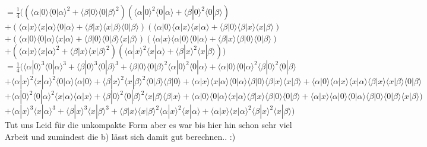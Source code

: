 \documentclass[a4paper]{scrartcl}
\begin{document}
\begin{enumerate}[a)]
$=\frac{1}{4} ((\langle \alpha|0\rangle \langle 0|\alpha\rangle^2 + \langle \beta|0\rangle \langle 0|\beta\rangle^2) (\langle \alpha|0\rangle^2 \langle 0|\alpha\rangle + \langle \beta|0\rangle^2 \langle 0|\beta\rangle)$\\
$+(\langle \alpha|x\rangle \langle x|\alpha\rangle\langle 0|\alpha\rangle + \langle \beta|x\rangle \langle x|\beta\rangle\langle 0|\beta\rangle) (\langle \alpha|0\rangle\langle \alpha|x\rangle \langle x|\alpha\rangle + \langle \beta|0\rangle\langle \beta|x\rangle \langle x|\beta\rangle) $\\
$+(\langle \alpha|0\rangle \langle 0|\alpha\rangle\langle x|\alpha\rangle + \langle \beta|0\rangle \langle 0|\beta\rangle\langle x|\beta\rangle) (\langle \alpha|x\rangle\langle \alpha|0\rangle \langle 0|\alpha\rangle + \langle \beta|x\rangle\langle \beta|0\rangle \langle 0|\beta\rangle) $\\
$+(\langle \alpha|x\rangle \langle x|\alpha\rangle^2 + \langle \beta|x\rangle \langle x|\beta\rangle^2) ( \langle\alpha|x\rangle^2 \langle x|\alpha\rangle + \langle \beta|x\rangle^2 \langle x|\beta\rangle))$\\

$=\frac{1}{4} (\langle \alpha|0\rangle^3 \langle 0|\alpha\rangle^3 + \langle \beta|0\rangle^3 \langle 0|\beta\rangle^3 + \langle \beta|0\rangle \langle 0|\beta\rangle^2 \langle \alpha|0\rangle^2 \langle 0|\alpha\rangle + \langle \alpha|0\rangle \langle 0|\alpha\rangle^2 \langle \beta|0\rangle^2 \langle 0|\beta\rangle$\\
$+\langle \alpha|x\rangle^2 \langle x|\alpha\rangle^2\langle 0|\alpha\rangle\langle \alpha|0\rangle + \langle \beta|x\rangle^2 \langle x|\beta\rangle^2\langle 0|\beta\rangle\langle \beta|0\rangle + \langle \alpha|x\rangle \langle x|\alpha\rangle\langle 0|\alpha\rangle  \langle \beta|0\rangle\langle \beta|x\rangle \langle x|\beta\rangle + \langle \alpha|0\rangle\langle \alpha|x\rangle \langle x|\alpha\rangle \langle \beta|x\rangle \langle x|\beta\rangle\langle 0|\beta\rangle$\\
$+\langle \alpha|0\rangle^2 \langle 0|\alpha\rangle^2\langle x|\alpha\rangle\langle \alpha|x\rangle + \langle \beta|0\rangle^2 \langle 0|\beta\rangle^2\langle x|\beta\rangle\langle \beta|x\rangle + \langle \alpha|0\rangle \langle 0|\alpha\rangle\langle x|\alpha\rangle \langle \beta|x\rangle\langle \beta|0\rangle \langle 0|\beta\rangle + \langle \alpha|x\rangle\langle \alpha|0\rangle \langle 0|\alpha\rangle \langle \beta|0\rangle \langle 0|\beta\rangle\langle x|\beta\rangle)$\\
$+\langle \alpha|x\rangle^3 \langle x|\alpha\rangle^3 + \langle \beta|x\rangle^3 \langle x|\beta\rangle^3 + \langle \beta|x\rangle \langle x|\beta\rangle^2 \langle \alpha|x\rangle^2 \langle x|\alpha\rangle + \langle \alpha|x\rangle \langle x|\alpha\rangle^2 \langle \beta|x\rangle^2 \langle x|\beta\rangle)$\\
Tut uns Leid für die unkompakte Form aber es war bis hier hin schon sehr viel Arbeit und zumindest die b) lässt sich damit gut berechnen.. :)


\end{enumerate}
\end{document}
